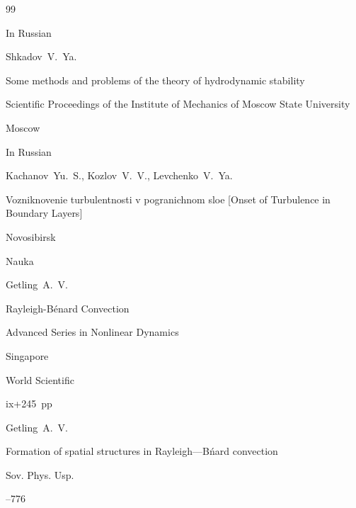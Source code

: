 \begin{thebibliography}{99}

\lang In Russian

\by Shkadov~V.~Ya.

\paper  Some methods and problems of the theory of hydrodynamic stability


\serial  Scientific Proceedings of the Institute of Mechanics of Moscow State University


\publaddr Moscow







\lang In Russian

\by Kachanov~Yu.~S., Kozlov~V.~V., Levchenko~V.~Ya.

\book Vozniknovenie turbulentnosti v pogranichnom sloe \rm [Onset of Turbulence in Boundary Layers]

\publaddr Novosibirsk

\publ Nauka










\by Getling~A.~V.

\book Rayleigh-B\'enard Convection

\serial Advanced Series in Nonlinear Dynamics



\publaddr Singapore

\publ World Scientific

\totalpages ix+245~pp \nofrills








\by Getling~A.~V.

\paper Formation of spatial structures in Rayleigh—B\'nard convection

\jour Sov. Phys. Usp. 



–776 


\end{thebibliography}
